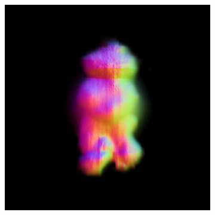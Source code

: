 \begin{figure}[ht]
    \centering
    \begin{subfigure}[b]{0.15\textwidth}
        \centering
        \fontsize{9pt}{7pt}\selectfont{}\vspace{3cm}
        \fontsize{9pt}{7pt}\selectfont{}\vspace{2.85cm}
        \fontsize{9pt}{7pt}\selectfont{}\vspace{1.95cm}
    \end{subfigure}
    \begin{subfigure}[b]{0.2\textwidth}
        \centering
        \includegraphics[width=\textwidth]{etc/a robot made out of plants/magic3d/magic3D_coarse_robot_0_part2.png}

\end{subfigure}
\end{figure}
